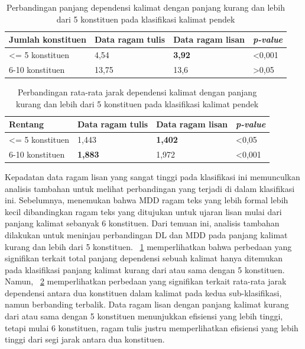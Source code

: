 \begin{table}
\begin{center}
\begin{small}
\caption{Perbandingan panjang dependensi kalimat dengan panjang kurang dan lebih dari 5 konstituen pada klasifikasi kalimat pendek}\label{tab:DL_5}
  \begin{tabular}{ | p{3.2cm} | p{3.2cm} | p{3.2cm} | p{2cm} |}
    \hline
Jumlah konstituen & Data ragam tulis & Data ragam lisan & \textit{p-value} \\ \hline
\textless= 5 konstituen & 4,54 & \textbf{3,92} & \textless 0,001 \\ \hline
6-10 konstituen & 13,75 & 13,6 & \textgreater 0,05 \\ \hline
   \end{tabular}
   \end{small}
\end{center}
\end{table}

\begin{table}
\begin{center}
\begin{small}
\caption{Perbandingan rata-rata jarak dependensi kalimat dengan panjang kurang dan lebih dari 5 konstituen pada klasifikasi kalimat pendek}\label{tab:MDD_5}
  \begin{tabular}{ | p{3.2cm} | p{3.2cm} | p{3.2cm} | p{2cm} |}
    \hline
Rentang & Data ragam tulis & Data ragam lisan & \textit{p-value} \\ \hline
\textless= 5 konstituen & 1,443 & \textbf{1,402} & \textless 0,05 \\ \hline
6-10 konstituen & \textbf{1,883} & 1,972 & \textless 0,001 \\ \hline
   \end{tabular}
   \end{small}
\end{center}
\end{table}

Kepadatan data ragam lisan yang sangat tinggi pada klasifikasi ini memunculkan analisis tambahan untuk melihat perbandingan yang terjadi di dalam klasifikasi ini. Sebelumnya, \cite{wang2017effects} menemukan bahwa MDD ragam teks yang lebih formal lebih kecil dibandingkan ragam teks yang ditujukan untuk ujaran lisan mulai dari panjang kalimat sebanyak 6 konstituen. Dari temuan ini, analisis tambahan dilakukan untuk meninjau perbandingan DL dan MDD pada panjang kalimat kurang dan lebih dari 5 konstituen. \tab~\ref{tab:DL_5} memperlihatkan bahwa perbedaan yang signifikan terkait total panjang dependensi sebuah kalimat hanya ditemukan pada klasifikasi panjang kalimat kurang dari atau sama dengan 5 konstituen. Namun, \tab~\ref{tab:MDD_5} memperlihatkan perbedaan yang signifikan terkait rata-rata jarak dependensi antara dua konstituen dalam kalimat pada kedua sub-klasifikasi, namun berbanding terbalik. Data ragam lisan dengan panjang kalimat kurang dari atau sama dengan 5 konstituen menunjukkan efisiensi yang lebih tinggi, tetapi mulai 6 konstituen, ragam tulis justru memperlihatkan efisiensi yang lebih tinggi dari segi jarak antara dua konstituen.

